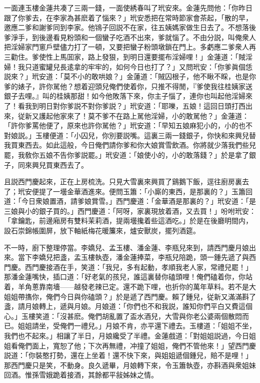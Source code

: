 一面連玉樓金蓮共凑了三兩一錢，一面使綉春叫了玳安來。金蓮先問他：「你昨日跟了你爹去，在李家為甚麽着了惱來？」玳安悉把在常時節家會茶起，「散的早，邀應二爹和謝爹同到李家。他鴇子回説不在家，往五姨媽家做生日去了。不想落後爹淨手，到後邊看見粉頭和一個蠻子吃酒不出來，爹就惱了。不由分説，叫俺衆人把淫婦家門窻戶壁儘力打了一頓，又要把蠻子粉頭墩鎖在門上。多虧應二爹衆人再三勸住。爹使性上馬囬家，路上發狠，到明日還要擺布淫婦哩！」金蓮道：「賊淫婦！我只道蜜罐兒長逺拿的牢牢的，如何今日也打了？」又問玳安：「你爹眞個恁説來？」玳安道：「莫不小的敢哄娘？」金蓮道：「賊囚根子，他不瞅不睬，也是你爹的婊子，許你駡他？想着迎頭兒俺們使着你，只推不得閒，『爹使我往桂姨家送銀子去哩。』叫的桂姨那甜！如今他敗落下來，你主子惱了，連你也叫起他淫婦來了！看我到明日對你爹説不對你爹説？」玳安道：「耶嚛，五娘！這回日頭打西出來，従新又護起他家來了！莫不爹不在路上駡他淫婦，小的敢駡他？」金蓮道：「許你爹罵他便了，原來也許你駡他？」玳安道：「早知五娘麻犯小的，小的也不對娘説。」玉樓便道：「小囚兒，你別要説嘴。這裏三兩一錢銀子，你快和來興兒替我買東西去。如此這般，今日俺們請你爹和你大娘賞雪飲酒。你將就少落我們些兒罷，我敎你五娘不告你爹説罷。」玳安道：「娘使小的，小的敢落錢？」於是拿了銀子，同來興兒買東西去了。

且説西門慶起來，正在上房梳洗。只見大雪裏來興買了鷄鵝下飯，逕往廚房裏去了；玳安便提了一壜金華酒進來。便問玉簫：「小廝的東西，是那裏的？」玉簫回道：「今日衆娘置酒，請爹娘賞雪。」西門慶道：「金華酒是那裏的？」玳安道：「是三娘與小的銀子買的。」西門慶道：「阿呀，家裏現放着酒，又去買！」吩咐玳安：「拿鑰匙，前邊廂房有雙料茉莉酒，提兩壜攙着些這酒吃。」於是在後廳明間内，設石崇錦帳圍屏，放下軸紙梅花暖簾來，爐安獸炭，擺列酒筵。

不一時，廚下整理停當。李嬌兒、孟玉樓、潘金蓮、李瓶兒來到，請西門慶月娘出來。當下李嬌兒把盞，孟玉樓執壺，潘金蓮捧菜，李瓶兒陪跪，頭一鍾先遞了與西門慶。西門慶接酒在手，笑道：「我兒，多有起動，孝順我老人家，常禮兒罷！」那潘金蓮嘴快，插口道：「好老氣的孩兒，誰這裏替你磕頭哩！俺們磕着你，你站着，羊角蔥靠南墻——越發老辣已定。還不跪下哩，也折你的萬年草料。若不是大姐姐帶㩦你，俺們今日與你磕頭？」於是遞了西門慶。賴了鍾兒，従新又滿滿斟了盞，請月娘轉上，遞與月娘。月娘道：「你們也不和我説，誰知你們平白又費這個心。」玉樓笑道：「沒甚麽。俺們胡亂置了盃水酒兒，大雪與你老公婆兩個散悶而已。姐姐請坐，受俺們一禮兒。」月娘不肯，亦平還下禮去。玉樓道：「姐姐不坐，我們也不起來。」相讓了半日，月娘纔受了半禮。金蓮戲道：「對姐姐説過，今日姐姐看俺們面上，寬恕了他；下次再無禮，冲撞了姐姐，俺們不管他來！」望西門慶説道：「你裝憨打勢，還在上坐着！還不快下來，與姐姐遞個鍾兒，賠不是哩！」那西門慶只是笑，不動身。良久遞畢，月娘轉下來，令玉簫執壺，亦斟酒與衆姐妹回酒。惟孫雪娥跪着接酒，其餘都平敍姊妹之情。


